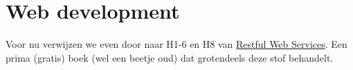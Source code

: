 \chapter{Web development}

Voor nu verwijzen we even door naar H1-6 en H8 van \href{https://www.crummy.com/writing/RESTful-Web-Services/html}{Restful Web Services}.
Een prima (gratis) boek (wel een beetje oud) dat grotendeels deze stof behandelt.



